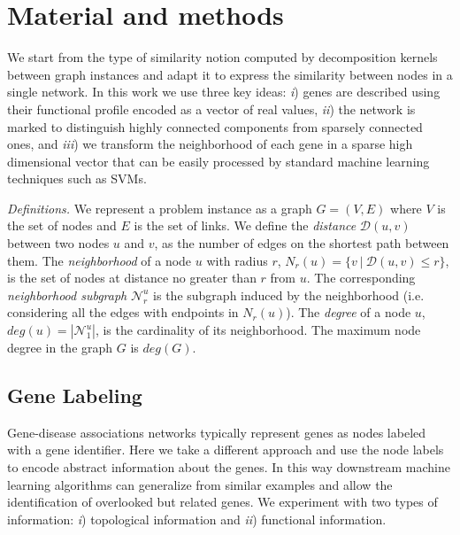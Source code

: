 \documentclass[review]{elsarticle}
\begin{document}
\section{Material and methods}
We start from the type of similarity notion computed by decomposition kernels between graph instances and adapt it to express the similarity between nodes in a single network. In this work we use three key ideas: \textit{i}) genes are described using their functional profile encoded as a vector of real values, \textit{ii}) the network is marked to distinguish highly connected components from sparsely connected ones, and \textit{iii}) we transform the neighborhood of each gene in a sparse high dimensional vector that can be easily processed by standard machine learning techniques such as SVMs.

\textit{Definitions.} 
We represent a problem instance as a graph $G=(V,E)$ where $V$ is the set of nodes and $E$ is the set of links.
We define the \textit{distance} $\mathcal{D}(u,v)$ between two nodes $u$ and $v$, as the number of edges on the shortest path between them. The \textit{neighborhood} of a node $u$ with radius $r$, $N_r(u) = \lbrace v\ |\ \mathcal{D}(u,v) \leq r \rbrace$, is the set of nodes at distance no greater than $r$ from $u$. The corresponding \textit{neighborhood subgraph} $\mathcal{N}_{r}^{u}$ is the  subgraph induced by the neighborhood (i.e. considering all the edges with endpoints in $N_r(u)$). The \textit{degree} of a node $u$, $deg(u) = |\mathcal{N}_{1}^{u}|$, is the cardinality of its neighborhood. The maximum node degree in the graph $G$ is $deg(G)$.


\subsection{Gene Labeling} Gene-disease associations networks typically represent genes as nodes labeled with a gene identifier. Here we take a different approach and use the node labels to encode abstract information about the genes. In this way downstream machine learning algorithms can generalize from similar examples and allow the identification of overlooked but related genes. We experiment with two types of information: \textit{i}) topological information and \textit{ii}) functional information. 
\end{document}
